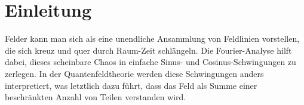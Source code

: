 %
%
%
%

\section{Einleitung\label{fourier:section:teil0}}


Felder kann man sich als eine unendliche Ansammlung von Feldlinien vorstellen, die sich kreuz und quer durch Raum-Zeit schlängeln. Die Fourier-Analyse hilft dabei, dieses scheinbare Chaos in einfache Sinus- und Cosinus-Schwingungen zu zerlegen. 
In der Quantenfeldtheorie werden diese Schwingungen anders interpretiert, was letztlich dazu führt, dass das Feld als Summe einer beschränkten Anzahl von Teilen verstanden wird.









